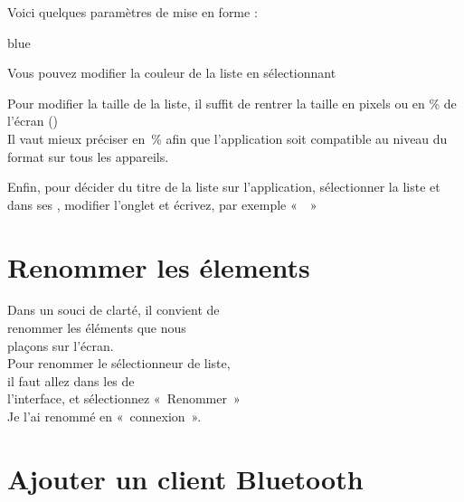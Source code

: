 

Voici quelques paramètres de mise en forme : 

\begin{items}{blue}{\Triangle}
    \item Vous pouvez modifier la couleur de la liste en sélectionnant 
    \item Pour modifier la taille de la liste, il suffit de rentrer la taille en pixels ou en \% de l'écran () \\	Il vaut mieux préciser en \% afin que l'application soit compatible au niveau du format sur tous les appareils.
\end{items}



Enfin, pour décider du titre de la liste sur l'application, sélectionner la liste  et dans ses , modifier l'onglet  et écrivez, par exemple «  »


\section{Renommer les élements}

Dans un souci de clarté, il convient de \\ renommer les éléments que nous \\ plaçons sur l'écran. \\

Pour renommer le sélectionneur de liste,\\ il faut allez dans les  de \\l'interface,  et sélectionnez  « Renommer » \\
Je l'ai renommé en « connexion ».






\section{Ajouter un client Bluetooth} \label{bluetooth_install}

